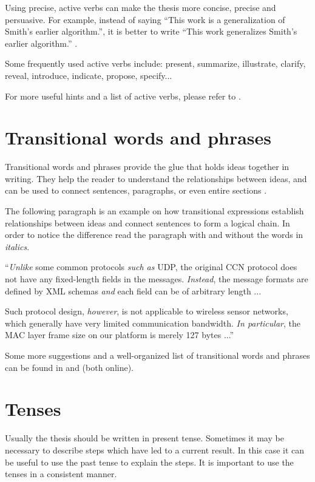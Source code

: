 Using precise, active verbs can make the thesis more concise, precise and persuasive. For example, instead of saying ``This work is a generalization of Smith's earlier algorithm.'', it is better to write ``This work generalizes Smith's earlier algorithm.'' \cite{hew03}.

Some frequently used active verbs include: present, summarize, illustrate, clarify, reveal, introduce, indicate, propose, specify...

For more useful hints and a list of active verbs, please refer to \cite{hew03}.

\section{Transitional words and phrases}

Transitional words and phrases provide the glue that holds ideas together in writing. They help the reader to understand the relationships between ideas, and can be used to connect sentences, paragraphs, or even entire sections \cite{har11}.

The following paragraph is an example on how transitional expressions establish relationships between ideas and connect sentences to form a logical chain. In order to notice the difference read the paragraph with and without the words in \textit{italics}.

``\textit{Unlike} some common protocols \textit{such as} UDP, the original CCN protocol does not have any fixed-length fields in the messages. \textit{Instead}, the message formats are defined by XML schemas \textit{and} each field can be of arbitrary length ...

Such protocol design, \textit{however}, is not applicable to wireless sensor networks, which generally have very limited communication bandwidth. \textit{In particular}, the MAC layer frame size on our platform is merely 127 bytes ...''

Some more suggestions and a well-organized list of transitional words and phrases can be found in \cite{har11} and \cite{poss} (both online).

\section{Tenses}

Usually the thesis should be written in present tense. Sometimes it may be necessary to describe steps which have led to a current result. In this case it can be useful to use the past tense to explain the steps. It is important to use the tenses in a consistent manner.

